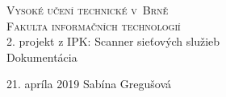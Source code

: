 \documentclass[11pt, a4paper]{article}
\begin{document}
\begin{titlepage}
\begin{center}
\Huge
\textsc{Vysoké učení technické v~Brně}\\
\huge
\textsc{Fakulta informačních technologií}\\
\LARGE 2. projekt z IPK: Scanner sieťových služieb\\
\Huge Dokumentácia
\end{center}
{\Large 21. apríla 2019 \hfill
Sabína Gregušová}
\end{titlepage}
\end{document}
